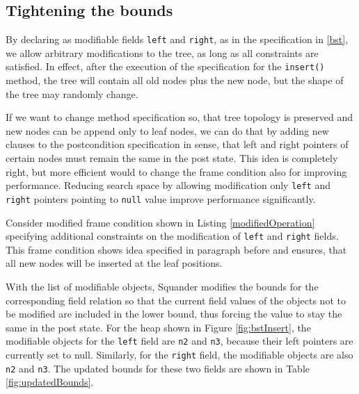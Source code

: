 \documentclass[11pt,twoside,a4paper]{book}
\begin{document}
\subsection{Tightening the bounds}
By declaring as modifiable fields \verb|left| and \verb|right|, as in the
specification in \ref{bst}, we allow arbitrary modifications to the tree, as
long as all constraints are satisfied. In effect, after the execution of the
specification for the \verb|insert()| method, the tree will contain all old
nodes plus the new node, but the shape of the tree may randomly change.

If we want to change method specification so, that tree topology is preserved
and new nodes can be append only to leaf nodes, we can do that by adding new
clauses to the postcondition specification in sense, that left and right
pointers of certain nodes must remain the same in the post state. This idea is
completely right, but more efficient would to change the frame condition also
for improving performance. Reducing search space by allowing modification only
\verb|left| and \verb|right| pointers pointing to \verb|null| value improve
performance significantly.

Consider modified frame condition shown in Listing \ref{modifiedOperation}
specifying additional constraints on the modification of \verb|left| and \verb|right| fields. This
frame condition shows idea specified in paragraph before and ensures, that all
new nodes will be inserted at the leaf positions.



With the list of modifiable objects, Squander modifies the bounds for the
corresponding field relation so that the current field values of the objects not
to be modified are included in the lower bound, thus forcing the value to stay
the same in the post state. For the heap shown in Figure \ref{fig:bstInsert},
the modifiable objects for the \verb|left| field are \verb|n2| and \verb|n3|,
because their left pointers are currently set to null. Similarly, for the
\verb|right| field, the modifiable objects are also \verb|n2| and \verb|n3|. The
updated bounds for these two fields are shown in Table \ref{fig:updatedBounds}.
\end{document}
